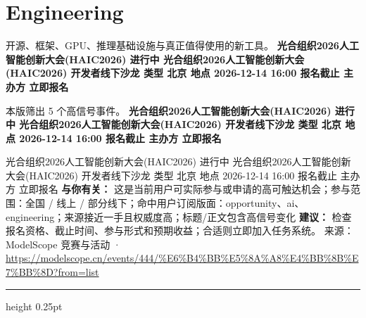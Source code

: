 \documentclass[10.5pt]{ctexart}
\begin{document}
\section*{Engineering}
{\color{ormuted} 开源、框架、GPU、推理基础设施与真正值得使用的新工具。}
\vspace{2mm}
{\LARGE\bfseries 光合组织2026人工智能创新大会(HAIC2026) 进行中 光合组织2026人工智能创新大会(HAIC2026) 开发者线下沙龙 类型 北京 地点 2026-12-14 16:00 报名截止 主办方 立即报名}\par
\vspace{1mm}
{\color{ormuted} 本版筛出 5 个高信号事件。}
\vspace{3mm}
{\Large\bfseries 光合组织2026人工智能创新大会(HAIC2026) 进行中 光合组织2026人工智能创新大会(HAIC2026) 开发者线下沙龙 类型 北京 地点 2026-12-14 16:00 报名截止 主办方 立即报名}\par
光合组织2026人工智能创新大会(HAIC2026) 进行中 光合组织2026人工智能创新大会(HAIC2026) 开发者线下沙龙 类型 北京 地点 2026-12-14 16:00 报名截止 主办方 立即报名
\textbf{与你有关：} 这是当前用户可实际参与或申请的高可触达机会；参与范围：全国 / 线上 / 部分线下；命中用户订阅版面：opportunity、ai、engineering；来源接近一手且权威度高；标题/正文包含高信号变化
\textbf{建议：} 检查报名资格、截止时间、参与形式和预期收益；合适则立即加入任务系统。
{\footnotesize\color{ormuted} 来源：ModelScope 竞赛与活动 · \url{https://modelscope.cn/events/444/%E6%B4%BB%E5%8A%A8%E4%BB%8B%E7%BB%8D?from=list}}
\vspace{4mm}
\hrule height 0.25pt
\vspace{3mm}
\end{document}
